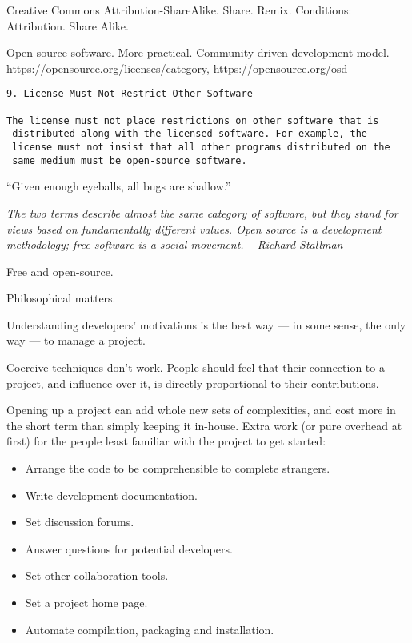 \documentclass[landscape,30pt]{foils}
\begin{document}
Creative Commons Attribution-ShareAlike.  Share.  Remix.  Conditions: Attribution.  Share Alike.

Open-source software.  More practical.  Community driven development model.  https://opensource.org/licenses/category, https://opensource.org/osd

{\tiny
\begin{verbatim}
9. License Must Not Restrict Other Software

The license must not place restrictions on other software that is
 distributed along with the licensed software. For example, the
 license must not insist that all other programs distributed on the
 same medium must be open-source software.
\end{verbatim}
}

``Given enough eyeballs, all bugs are shallow.''

{\em The two terms describe almost the same category of software, but they
stand for views based on fundamentally different values. Open source
is a development methodology; free software is a social movement.  -- Richard Stallman}

Free and open-source.

Philosophical matters.  

Understanding developers' motivations is the best way — in some sense, the only way — to manage a project.

Coercive techniques don't work.  People should feel that their
connection to a project, and influence over it, is directly
proportional to their contributions.

Opening up a project can add whole new sets of complexities, and cost
more in the short term than simply keeping it in-house.  Extra work
(or pure overhead at first) for the people least familiar with the
project to get started:

\begin{itemize}
\item Arrange the code to be comprehensible to complete strangers.
\item Write development documentation.
\item Set discussion forums.
\item Answer questions for potential developers.
\item Set other collaboration tools.
\item Set a project home page.
\item Automate compilation, packaging and installation.
\end{itemize}
\end{document}
